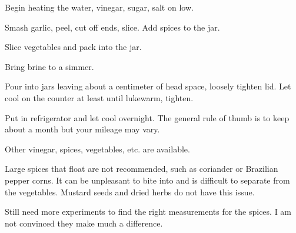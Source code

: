 \begin{preparation}
	\item Begin heating the water, vinegar, sugar, salt on low.
	\item Smash garlic, peel, cut off ends, slice.
		Add spices to the jar.
	\item Slice vegetables and pack into the jar.
	\item Bring brine to a simmer.
	\item Pour into jars leaving about a centimeter of head space, loosely tighten lid.
		Let cool on the counter at least until lukewarm, tighten.
	\item Put in refrigerator and let cool overnight.
		The general rule of thumb is to keep about a month but your mileage may vary.
\end{preparation}


\begin{variation}
	\item Other vinegar, spices, vegetables, etc. are available.
\end{variation}


\begin{experiments}
	\item Large spices that float are not recommended, such as coriander or Brazilian pepper corns.
		It can be unpleasant to bite into and is difficult to separate from the vegetables.
		Mustard seeds and dried herbs do not have this issue.
	\item Still need more experiments to find the right measurements for the spices.
		I am not convinced they make much a difference.
\end{experiments}

\recipeend%
